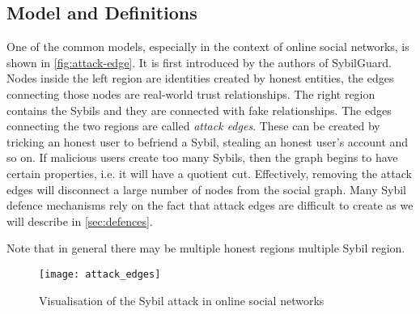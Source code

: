 
\subsection{Model and Definitions}
One of the common models, especially in the context of online social networks,
is shown in \autoref{fig:attack-edge}. It is first introduced by the authors of
SybilGuard\cite{yu2006sybilguard}. Nodes inside the left region are identities
created by honest entities, the edges connecting those nodes are real-world
trust relationships. The right region contains the Sybils and they are connected
with fake relationships. The edges connecting the two regions are called
\emph{attack edges}. These can be created by tricking an honest user to befriend
a Sybil, stealing an honest user's account and so on. If malicious users create
too many Sybils, then the graph begins to have certain properties, i.e. it will
have a quotient cut. Effectively, removing the attack edges will disconnect a
large number of nodes from the social graph. Many Sybil defence mechanisms rely
on the fact that attack edges are difficult to create as we will describe in
\autoref{sec:defences}. 

Note that in general there may be multiple honest regions multiple Sybil region. 

\begin{figure}
  \centering
  \texttt{[image: attack\_edges]}
  \caption{Visualisation of the Sybil attack in online social networks}
  \label{fig:attack-edge}
\end{figure}


